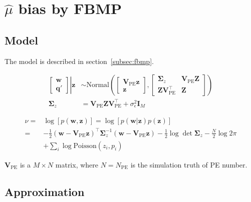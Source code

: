\appendix
\section{$\hat{\mu}$ bias by FBMP}
\label{sec:mubias}

\subsection{Model}

The model is described in section~\ref{subsec:fbmp}. 

\begin{equation}
\begin{aligned}
    \left.
    \begin{bmatrix}
        \bm{w} \\
        \bm{q}'
    \end{bmatrix}
    \right\vert\bm{z}
    &\sim \mathrm{Normal}\left(
    \begin{bmatrix}
        \bm{V}_\mathrm{PE}\bm{z} \\
        \bm{z}
    \end{bmatrix}, 
    \begin{bmatrix}
        \bm{\Sigma}_z & \bm{V}_\mathrm{PE}\bm{Z} \\
        \bm{Z}\bm{V}_\mathrm{PE}^\intercal & \bm{Z}
    \end{bmatrix}
    \right) \\
    \bm{\Sigma}_z &= \bm{V}_\mathrm{PE}\bm{Z}\bm{V}_\mathrm{PE}^\intercal+\sigma_\epsilon^2\bm{I}_M 
\end{aligned}
\end{equation}

\begin{equation}
\begin{aligned}
    \nu =& \log[p(\bm{w},\bm{z})] = \log[p(\bm{w}|\bm{z})p(\bm{z})] \\
    =& -\frac{1}{2}(\bm{w}-\bm{V}_\mathrm{PE}\bm{z})^\intercal\bm{\Sigma}_z^{-1}(\bm{w}-\bm{V}_\mathrm{PE}\bm{z})-\frac{1}{2}\log\det\bm{\Sigma}_z-\frac{N}{2}\log2\pi \\
    &+ \sum_{i}\log{\mathrm{Poisson}(z_i,p_i)}
\end{aligned}
\end{equation}

$\bm{V}_\mathrm{PE}$ is a $M\times N$ matrix, where $N=N_\mathrm{PE}$ is the simulation truth of PE number. 

\subsection{Approximation}

